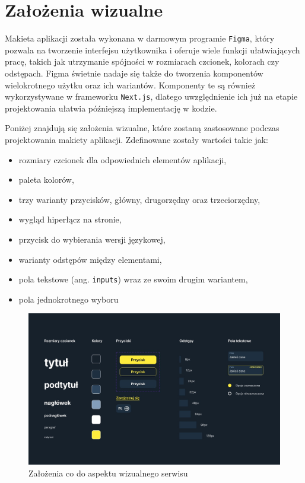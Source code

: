 \section{Założenia wizualne}
Makieta aplikacji została wykonana w darmowym programie \texttt{Figma}, który pozwala na tworzenie interfejsu użytkownika i oferuje wiele funkcji ułatwiających pracę, takich jak utrzymanie spójności w rozmiarach czcionek, kolorach czy odstępach. Figma świetnie nadaje się także do tworzenia komponentów wielokrotnego użytku oraz ich wariantów. Komponenty te są również wykorzystywane w frameworku \texttt{Next.js}, dlatego uwzględnienie ich już na etapie projektowania ułatwia późniejszą implementację w kodzie.

Poniżej znajdują się założenia wizualne, które zostaną zastosowane podczas projektowania makiety aplikacji. Zdefinowane zostały wartości takie jak:
\begin{itemize}
    \item rozmiary czcionek dla odpowiednich elementów aplikacji,
    \item paleta kolorów,
    \item trzy warianty przycisków, główny, drugorzędny oraz trzeciorzędny,
    \item wygląd hiperłącz na stronie,
    \item przycisk do wybierania wersji językowej,
    \item warianty odstępów między elementami,
    \item pola tekstowe (ang. \texttt{inputs}) wraz ze swoim drugim wariantem,
    \item pola jednokrotnego wyboru
\end{itemize}
\begin{figure}[H]
	\centering
		\includegraphics[width=0.7\linewidth]{rozdzial1/komponenty.png}
	\caption{Założenia co do aspektu wizualnego serwisu}
	\label{Rys. fig:Założenia wizualne serwisu}
\end{figure}

